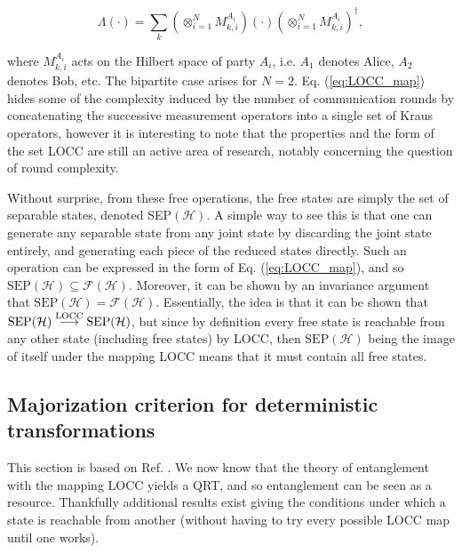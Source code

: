 \begin{equation}
    \Lambda (\cdot) = \sum_{k} \left(\otimes^N_{i=1} M^{A_i}_{k, i}\right) (\cdot) \left(\otimes^N_{i=1} M^{A_i}_{k, i}\right)^\dagger, \label{eq:LOCC_map}
\end{equation}

\noindent where $M^{A_i}_{k, i}$ acts on the Hilbert space of party $A_i$, i.e. $A_1$ denotes Alice, $A_2$ denotes Bob, etc. The bipartite case arises for $N=2$. Eq. (\ref{eq:LOCC_map}) hides some of the complexity induced by the number of communication rounds by concatenating the successive measurement operators into a single set of Kraus operators, however it is interesting to note that the properties and the form of the set LOCC are still an active area of research, notably concerning the question of round complexity.

Without surprise, from these free operations, the free states are simply the set of separable states, denoted SEP$(\mathcal{H})$. A simple way to see this is that one can generate any separable state from any joint state by discarding the joint state entirely, and generating each piece of the reduced states directly. Such an operation can be expressed in the form of Eq. (\ref{eq:LOCC_map}), and so $\text{SEP}(\mathcal{H}) \subseteq \mathcal{F}(\mathcal{H})$. Moreover, it can be shown by an invariance argument that $\text{SEP}(\mathcal{H}) = \mathcal{F}(\mathcal{H})$. Essentially, the idea is that it can %
be shown that $\text{SEP}(\mathcal{H}) \overset{\text{LOCC}}{\longrightarrow} \text{SEP}(\mathcal{H})$, but since by definition every free state is reachable from any other state (including free states) by LOCC, then $\text{SEP}(\mathcal{H})$ being the image of itself under the mapping LOCC means that it must contain all free states. %



\subsection{Majorization criterion for deterministic transformations} \label{sec:nielsen}

This section is based on Ref. \cite{nielsen_conditions_1999}. We now know that the theory of entanglement with the mapping LOCC yields a QRT, and so entanglement can be seen as a resource. Thankfully additional results exist giving the conditions under which a state is reachable from another (without having to try every possible LOCC map until one works).


